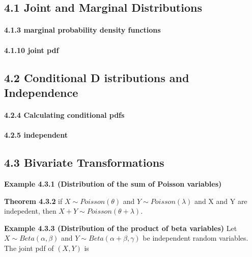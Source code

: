 \documentclass[6pt,Portrait]{article}
\let\oldparagraph\paragraph
\renewcommand{\paragraph}[1]{\oldparagraph{#1}\mbox{}}
\begin{document}
\hypertarget{joint-and-marginal-distributions}{%
\subsection{4.1 Joint and Marginal
Distributions}\label{joint-and-marginal-distributions}}

\hypertarget{marg}{%
\paragraph{4.1.3 marginal probability density functions}\label{marg}}

\hypertarget{joint}{%
\paragraph{4.1.10 joint pdf}\label{joint}}

\hypertarget{conditional-d-istributions-and-independence}{%
\subsection{4.2 Conditional D istributions and
Independence}\label{conditional-d-istributions-and-independence}}

\hypertarget{cond}{%
\paragraph{4.2.4 Calculating conditional pdfs}\label{cond}}

\hypertarget{indep-1}{%
\paragraph{4.2.5 independent}\label{indep-1}}

\hypertarget{trans}{%
\subsection{4.3 Bivariate Transformations}\label{trans}}

\textbf{Example 4.3.1 (Distribution of the sum of Poisson variables)}

\textbf{Theorem 4.3.2} if \(X\sim Poisson(\theta)\) and
\(Y\sim Poisson(\lambda)\) and X and Y are indepedent, then
\(X+Y\sim Poisson(\theta+\lambda)\).

\textbf{Example 4.3.3 (Distribution of the product of beta variables)}
Let \(X\sim Beta(\alpha,\beta)\) and \(Y\sim Beta(\alpha+\beta,\gamma)\)
be independent random variables. The joint pdf of \((X,Y)\) is
\end{document}
